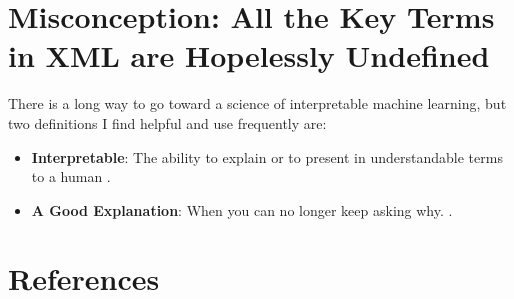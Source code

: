 \documentclass[fleqn]{article}
\begin{document}
\section{Misconception: All the Key Terms in XML are Hopelessly Undefined}

There is a long way to go toward a science of interpretable machine learning, but two definitions I find helpful and use frequently are:

\begin{itemize}
\item \textbf{Interpretable}: The ability to explain or to present in understandable terms to a human \cite{been_kim1}.
\item \textbf{A Good Explanation}: When you can no longer keep asking why. \cite{gilpin2018explaining}.
\end{itemize}

\section{References}

\vspace{-0.25in}

\footnotesize
 
\end{document}
